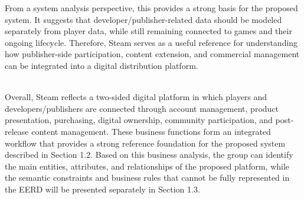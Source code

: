 From a system analysis perspective, this provides a strong basis for the proposed system. It suggests that developer/publisher-related data should be modeled separately from player data, while still remaining connected to games and their ongoing lifecycle. Therefore, Steam serves as a useful reference for understanding how publisher-side participation, content extension, and commercial management can be integrated into a digital distribution platform.
\\
\\
\vspace{0.5em}
\par\vspace{0.3em}
Overall, Steam reflects a two-sided digital platform in which players and developers/publishers are connected through account management, product presentation, purchasing, digital ownership, community participation, and post-release content management. These business functions form an integrated workflow that provides a strong reference foundation for the proposed system described in Section 1.2. Based on this business analysis, the group can identify the main entities, attributes, and relationships of the proposed platform, while the semantic constraints and business rules that cannot be 
fully represented in the EERD will be presented separately in Section 1.3.
\newpage